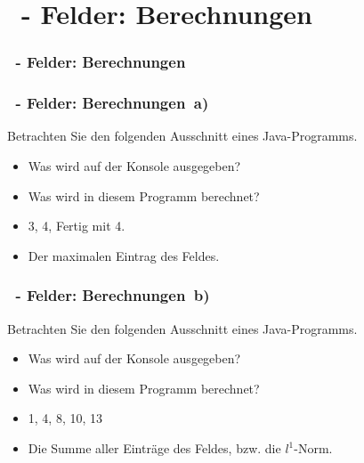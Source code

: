 \def\stitle{\theexercise\ - Felder: Berechnungen}
\section{\stitle}
\begin{frame}
  \frametitle{\stitle}%
\tableofcontents[current]
\end{frame}



\begin{frame}[t]%
    \frametitle{\stitle ~a)}
Betrachten Sie den folgenden Ausschnitt eines Java-Programms.

\begin{itemize}
    \item Was wird auf der Konsole ausgegeben?
    \item Was wird in diesem Programm berechnet?
    \pause
    \item 3, 4, Fertig mit 4.
    \item Der maximalen Eintrag des Feldes.
\end{itemize}
\end{frame}

\begin{frame}[t]%
    \frametitle{\stitle ~b)}
Betrachten Sie den folgenden Ausschnitt eines Java-Programms.

\begin{itemize}
    \item Was wird auf der Konsole ausgegeben?
    \item Was wird in diesem Programm berechnet?
    \pause
    \item 1, 4, 8, 10, 13
    \item Die Summe aller Einträge des Feldes, bzw. die $l^1$-Norm.
\end{itemize}
\end{frame}